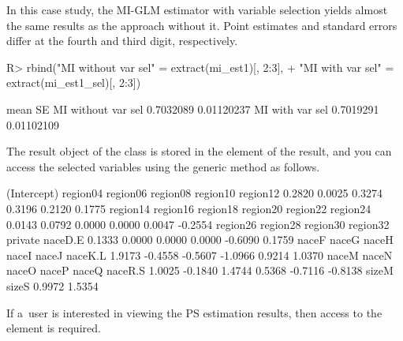 \documentclass[nojss]{jss}
\begin{document}
In this case study, the MI-GLM estimator with variable selection yields
almost the same results as the approach without it. Point estimates and
standard errors differ at the fourth and third digit, respectively.

\begin{CodeChunk}
\begin{CodeInput}
R> rbind("MI without var sel" = extract(mi_est1)[, 2:3],
+       "MI with var sel"    = extract(mi_est1_sel)[, 2:3])
\end{CodeInput}
\begin{CodeOutput}
                        mean         SE
MI without var sel 0.7032089 0.01120237
MI with var sel    0.7019291 0.01102109
\end{CodeOutput}
\end{CodeChunk}

The result object of the  class is stored in the
 element of the result, and you can access the selected
variables using the  generic method as follows.

\begin{CodeChunk}
\begin{CodeOutput}
(Intercept)    region04    region06    region08    region10    region12 
     0.2820      0.0025      0.3274      0.3196      0.2120      0.1775 
   region14    region16    region18    region20    region22    region24 
     0.0143      0.0792      0.0000      0.0000      0.0047     -0.2554 
   region26    region28    region30    region32     private     naceD.E 
     0.1333      0.0000      0.0000      0.0000     -0.6090      0.1759 
      naceF       naceG       naceH       naceI       naceJ     naceK.L 
     1.9173     -0.4558     -0.5607     -1.0966      0.9214      1.0370 
      naceM       naceN       naceO       naceP       naceQ     naceR.S 
     1.0025     -0.1840      1.4744      0.5368     -0.7116     -0.8138 
      sizeM       sizeS 
     0.9972      1.5354 
\end{CodeOutput}
\end{CodeChunk}

If a~user is interested in viewing the PS estimation results, then
access to the  element is required.
\end{document}
